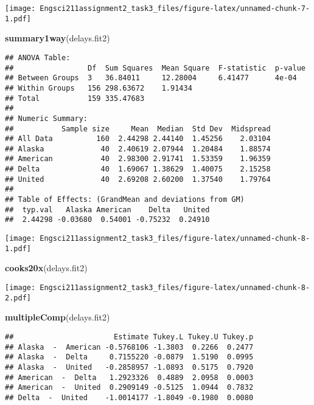 \documentclass[]{article}
\newenvironment{Shaded}{\begin{snugshade}}{\end{snugshade}}
\newcommand{\KeywordTok}[1]{\textcolor[rgb]{0.13,0.29,0.53}{\textbf{#1}}}
\newcommand{\NormalTok}[1]{#1}
\begin{document}
\texttt{[image: Engsci211assignment2\_task3\_files/figure-latex/unnamed-chunk-7-1.pdf]}

\begin{Shaded}
\begin{Highlighting}[]
\KeywordTok{summary1way}\NormalTok{(delays.fit2)}
\end{Highlighting}
\end{Shaded}

\begin{verbatim}
## ANOVA Table:
##                 Df  Sum Squares  Mean Square  F-statistic  p-value   
## Between Groups  3   36.84011     12.28004     6.41477      4e-04     
## Within Groups   156 298.63672    1.91434                             
## Total           159 335.47683                                        
## 
## Numeric Summary:
##           Sample size     Mean  Median  Std Dev  Midspread
## All Data          160  2.44298 2.44140  1.45256    2.03104
## Alaska             40  2.40619 2.07944  1.20484    1.88574
## American           40  2.98300 2.91741  1.53359    1.96359
## Delta              40  1.69067 1.38629  1.40075    2.15258
## United             40  2.69208 2.60200  1.37540    1.79764
## 
## Table of Effects: (GrandMean and deviations from GM)
##  typ.val   Alaska American    Delta   United 
##  2.44298 -0.03680  0.54001 -0.75232  0.24910
\end{verbatim}

\texttt{[image: Engsci211assignment2\_task3\_files/figure-latex/unnamed-chunk-8-1.pdf]}

\begin{Shaded}
\begin{Highlighting}[]
\KeywordTok{cooks20x}\NormalTok{(delays.fit2)}
\end{Highlighting}
\end{Shaded}

\texttt{[image: Engsci211assignment2\_task3\_files/figure-latex/unnamed-chunk-8-2.pdf]}

\begin{Shaded}
\begin{Highlighting}[]
\KeywordTok{multipleComp}\NormalTok{(delays.fit2)}
\end{Highlighting}
\end{Shaded}

\begin{verbatim}
##                       Estimate Tukey.L Tukey.U Tukey.p
## Alaska  -  American -0.5768106 -1.3803  0.2266  0.2477
## Alaska  -  Delta     0.7155220 -0.0879  1.5190  0.0995
## Alaska  -  United   -0.2858957 -1.0893  0.5175  0.7920
## American  -  Delta   1.2923326  0.4889  2.0958  0.0003
## American  -  United  0.2909149 -0.5125  1.0944  0.7832
## Delta  -  United    -1.0014177 -1.8049 -0.1980  0.0080
\end{verbatim}
\end{document}
